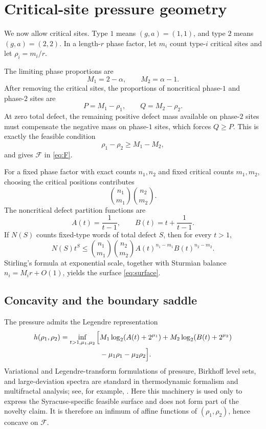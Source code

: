 \documentclass[11pt]{amsart}
\newcommand{\Fcal}{\mathcal F}
\begin{document}
\section{Critical-site pressure geometry}\label{sec:density}

We now allow critical sites.  Type \(1\) means \((g,a)=(1,1)\), and type \(2\) means \((g,a)=(2,2)\).  In a length-\(r\) phase factor, let \(m_i\) count type-\(i\) critical sites and let \(\rho_i=m_i/r\).

The limiting phase proportions are
\[
 M_1=2-\alpha,
 \qquad
 M_2=\alpha-1.
\]
After removing the critical sites, the proportions of noncritical phase-\(1\) and phase-\(2\) sites are
\[
 P=M_1-\rho_1,
 \qquad
 Q=M_2-\rho_2.
\]
At zero total defect, the remaining positive defect mass available on phase-\(2\) sites must compensate the negative mass on phase-\(1\) sites, which forces \(Q\ge P\).  This is exactly the feasible condition
\[
 \rho_1-\rho_2\ge M_1-M_2,
\]
and gives \(\Fcal\) in \eqref{eq:F}.

For a fixed phase factor with exact counts \(n_1,n_2\) and fixed critical counts \(m_1,m_2\), choosing the critical positions contributes
\[
 \binom{n_1}{m_1}\binom{n_2}{m_2}.
\]
The noncritical defect partition functions are
\[
 A(t)=\frac1{t-1},
 \qquad
 B(t)=t+\frac1{t-1}.
\]
If \(N(S)\) counts fixed-type words of total defect \(S\), then for every \(t>1\),
\begin{equation}\label{eq:fixedtype}
 N(S)t^S
 \le
 \binom{n_1}{m_1}\binom{n_2}{m_2}
 A(t)^{n_1-m_1}B(t)^{n_2-m_2}.
\end{equation}
Stirling's formula at exponential scale, together with Sturmian balance \(n_i=M_i r+O(1)\), yields the surface \eqref{eq:surface}.

\subsection{Concavity and the boundary saddle}

The pressure admits the Legendre representation
\begin{align}\label{eq:legendre}
 h(\rho_1,\rho_2)=\inf_{t>1,\mu_1,\mu_2}\Big[&
 M_1\log_2(A(t)+2^{\mu_1})
 +M_2\log_2(B(t)+2^{\mu_2})\\
 &-\mu_1\rho_1-\mu_2\rho_2
 \Big].\notag
\end{align}
Variational and Legendre-transform formulations of pressure, Birkhoff level sets, and large-deviation spectra are standard in thermodynamic formalism and multifractal analysis; see, for example, \cite{PesinWeiss2001,TakensVerbitskiy2003}.  Here this machinery is used only to express the Syracuse-specific feasible surface and does not form part of the novelty claim.
It is therefore an infimum of affine functions of \((\rho_1,\rho_2)\), hence concave on \(\Fcal\).
\end{document}
